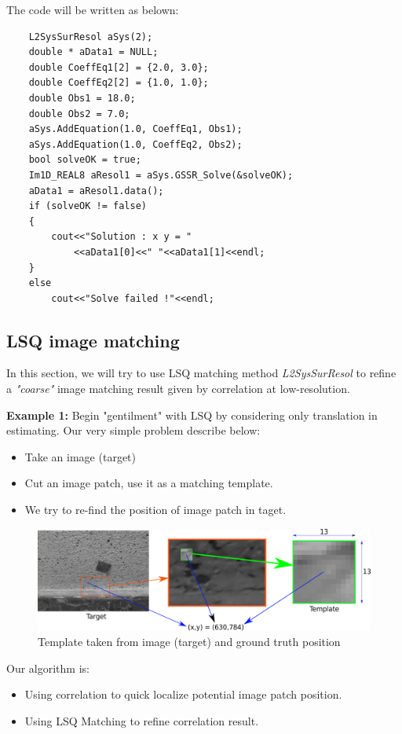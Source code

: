 \documentclass[twoside]{article}
\begin{document}
The code will be written as belown:
\begin{lstlisting}
    L2SysSurResol aSys(2); 
    double * aData1 = NULL;
    double CoeffEq1[2] = {2.0, 3.0};
    double CoeffEq2[2] = {1.0, 1.0};
    double Obs1 = 18.0;
    double Obs2 = 7.0;
    aSys.AddEquation(1.0, CoeffEq1, Obs1);
	aSys.AddEquation(1.0, CoeffEq2, Obs2);
    bool solveOK = true; 
    Im1D_REAL8 aResol1 = aSys.GSSR_Solve(&solveOK);
    aData1 = aResol1.data();	
    if (solveOK != false)
    {	
        cout<<"Solution : x y = "
            <<aData1[0]<<" "<<aData1[1]<<endl;
    }
    else
        cout<<"Solve failed !"<<endl;
\end{lstlisting}

\subsection{LSQ image matching}

In this section, we will try to use LSQ matching method {\color{blue}\textit{L2SysSurResol}} to refine a \textit{"coarse"} image matching result given by correlation at low-resolution.


\textbf{Example 1:} 
Begin "gentilment" with LSQ by considering only translation in estimating. Our very simple problem describe below:
\begin{itemize}
  \item Take an image (target)
  \item Cut an image patch, use it as a matching template.
  \item We try to re-find the position of image patch in taget.
\end{itemize}

\begin{figure}[h] 
\includegraphics[width=15cm]{template_target.png}
\caption{Template taken from image (target) and ground truth position}
\label{fig:1.1}
\end{figure}

Our algorithm is:
\begin{itemize}
  \item Using correlation to quick localize potential image patch position.
  \item Using LSQ Matching to refine correlation result.
\end{itemize}
\end{document}
